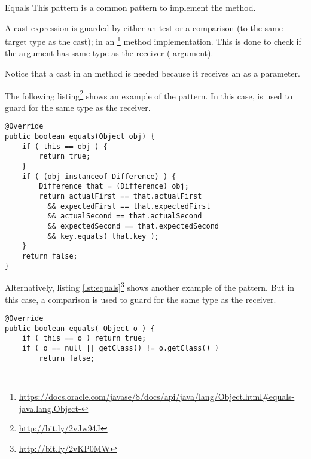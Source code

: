 
\begin{pattern}{Equals}
This pattern is a common pattern to implement the  method.

A cast expression is guarded by either an  test or
a  comparison (to the same target type as the cast);
in an \footnote{\url{https://docs.oracle.com/javase/8/docs/api/java/lang/Object.html\#equals-java.lang.Object-}}
method implementation.
This is done to check if the argument has same type as the receiver
( argument).

Notice that a cast in an  method is needed because it
receives an  as a parameter.

\instances


The following listing\footnote{\url{http://bit.ly/2vJw94J}}
shows an example of the \pname{} pattern.
In this case,  is used to guard for
the same type as the receiver.

\begin{lstlisting}[style=java,caption={\pname{} pattern using \code{instanceof} as a guard.}]
@Override
public boolean equals(Object obj) {
    if ( this == obj ) {
        return true;
    }
    if ( (obj instanceof Difference) ) {
        Difference that = (Difference) obj;
        return actualFirst == that.actualFirst
          && expectedFirst == that.expectedFirst
          && actualSecond == that.actualSecond 
          && expectedSecond == that.expectedSecond
          && key.equals( that.key );
    }
    return false;
}
\end{lstlisting}


Alternatively,
listing \ref{lst:equals}\footnote{\url{http://bit.ly/2vKP0MW}} shows
another example of the \pname{} pattern.
But in this case,
a  comparison is used to guard for the same type
as the receiver.

\begin{lstlisting}[style=java,label=lst:equals,caption=\pname{} pattern guarded by a \code{getClass} comparison]
@Override
public boolean equals( Object o ) {
    if ( this == o ) return true;
    if ( o == null || getClass() != o.getClass() )
        return false;


\end{lstlisting}
\end{pattern}

